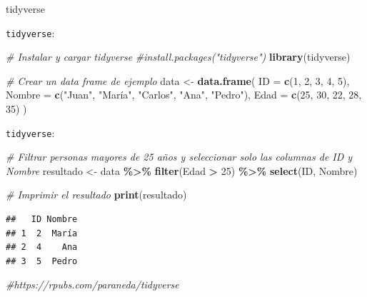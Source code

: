 \documentclass[
  ignorenonframetext,
]{beamer}
\newenvironment{Shaded}{\begin{snugshade}}{\end{snugshade}}
\newcommand{\AttributeTok}[1]{\textcolor[rgb]{0.13,0.29,0.53}{#1}}
\newcommand{\CommentTok}[1]{\textcolor[rgb]{0.56,0.35,0.01}{\textit{#1}}}
\newcommand{\DecValTok}[1]{\textcolor[rgb]{0.00,0.00,0.81}{#1}}
\newcommand{\FunctionTok}[1]{\textcolor[rgb]{0.13,0.29,0.53}{\textbf{#1}}}
\newcommand{\NormalTok}[1]{#1}
\newcommand{\OtherTok}[1]{\textcolor[rgb]{0.56,0.35,0.01}{#1}}
\newcommand{\SpecialCharTok}[1]{\textcolor[rgb]{0.81,0.36,0.00}{\textbf{#1}}}
\newcommand{\StringTok}[1]{\textcolor[rgb]{0.31,0.60,0.02}{#1}}
\begin{document}
\begin{frame}[fragile]{tidyverse}
\begin{block}{\texttt{tidyverse}:}
\protect\hypertarget{tidyverse-1}{}
\begin{Shaded}
\begin{Highlighting}[]
\CommentTok{\# Instalar y cargar tidyverse}
\CommentTok{\#install.packages("tidyverse")}
\FunctionTok{library}\NormalTok{(tidyverse)}

\CommentTok{\# Crear un data frame de ejemplo}
\NormalTok{data }\OtherTok{\textless{}{-}} \FunctionTok{data.frame}\NormalTok{(}
  \AttributeTok{ID =} \FunctionTok{c}\NormalTok{(}\DecValTok{1}\NormalTok{, }\DecValTok{2}\NormalTok{, }\DecValTok{3}\NormalTok{, }\DecValTok{4}\NormalTok{, }\DecValTok{5}\NormalTok{),}
  \AttributeTok{Nombre =} \FunctionTok{c}\NormalTok{(}\StringTok{"Juan"}\NormalTok{, }\StringTok{"María"}\NormalTok{, }\StringTok{"Carlos"}\NormalTok{, }\StringTok{"Ana"}\NormalTok{, }\StringTok{"Pedro"}\NormalTok{),}
  \AttributeTok{Edad =} \FunctionTok{c}\NormalTok{(}\DecValTok{25}\NormalTok{, }\DecValTok{30}\NormalTok{, }\DecValTok{22}\NormalTok{, }\DecValTok{28}\NormalTok{, }\DecValTok{35}\NormalTok{)}
\NormalTok{)}
\end{Highlighting}
\end{Shaded}
\end{block}

\begin{block}{\texttt{tidyverse}:}
\protect\hypertarget{tidyverse-2}{}
\begin{Shaded}
\begin{Highlighting}[]
\CommentTok{\# Filtrar personas mayores de 25 años y seleccionar solo las columnas de ID y Nombre}
\NormalTok{resultado }\OtherTok{\textless{}{-}}\NormalTok{ data }\SpecialCharTok{\%\textgreater{}\%}
  \FunctionTok{filter}\NormalTok{(Edad }\SpecialCharTok{\textgreater{}} \DecValTok{25}\NormalTok{) }\SpecialCharTok{\%\textgreater{}\%}
  \FunctionTok{select}\NormalTok{(ID, Nombre)}

\CommentTok{\# Imprimir el resultado}
\FunctionTok{print}\NormalTok{(resultado)}
\end{Highlighting}
\end{Shaded}

\begin{verbatim}
##   ID Nombre
## 1  2  María
## 2  4    Ana
## 3  5  Pedro
\end{verbatim}

\begin{Shaded}
\begin{Highlighting}[]
\CommentTok{\#https://rpubs.com/paraneda/tidyverse}
\end{Highlighting}
\end{Shaded}
\end{block}
\end{frame}
\end{document}
